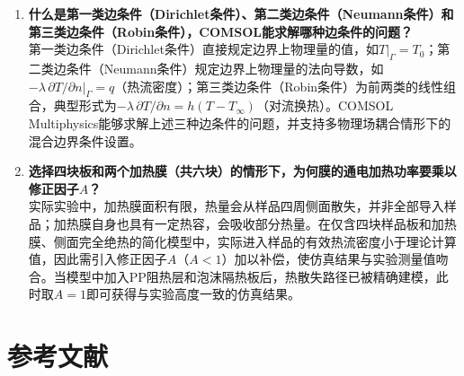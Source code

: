 \documentclass[a4paper,8pt,twocolumn]{article}
\begin{document}
\begin{enumerate}
  \item \textbf{什么是第一类边条件（Dirichlet条件）、第二类边条件（Neumann条件）和第三类边条件（Robin条件），COMSOL能求解哪种边条件的问题？}\\[0.3em]
  第一类边条件（Dirichlet条件）直接规定边界上物理量的值，如$T|_\Gamma=T_0$；第二类边条件（Neumann条件）规定边界上物理量的法向导数，如$-\lambda\,\partial T/\partial n|_\Gamma=q$（热流密度）；第三类边条件（Robin条件）为前两类的线性组合，典型形式为$-\lambda\,\partial T/\partial n=h(T-T_\infty)$（对流换热）。COMSOL Multiphysics能够求解上述三种边条件的问题，并支持多物理场耦合情形下的混合边界条件设置。

  \item \textbf{选择四块板和两个加热膜（共六块）的情形下，为何膜的通电加热功率要乘以修正因子$A$？}\\[0.3em]
  实际实验中，加热膜面积有限，热量会从样品四周侧面散失，并非全部导入样品；加热膜自身也具有一定热容，会吸收部分热量。在仅含四块样品板和加热膜、侧面完全绝热的简化模型中，实际进入样品的有效热流密度小于理论计算值，因此需引入修正因子$A$（$A<1$）加以补偿，使仿真结果与实验测量值吻合。当模型中加入PP阻热层和泡沫隔热板后，热散失路径已被精确建模，此时取$A=1$即可获得与实验高度一致的仿真结果。
\end{enumerate}

\clearpage
\onecolumn
\section*{参考文献}
\end{document}
